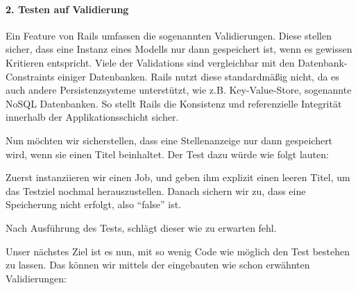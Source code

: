 \paragraph{2. Testen auf Validierung}

Ein Feature von Rails umfassen die sogenannten Validierungen. Diese stellen sicher, dass eine Instanz eines Modells nur dann gespeichert ist, wenn es gewissen Kritieren entspricht. Viele der Validations sind vergleichbar mit den Datenbank-Constraints einiger Datenbanken. Rails nutzt diese standardmäßig nicht, da es auch andere Persistenzsysteme unterstützt, wie z.B. Key-Value-Store, sogenannte NoSQL Datenbanken. So stellt Rails die Konsistenz und referenzielle Integrität innerhalb der Applikationsschicht sicher.

Nun möchten wir sicherstellen, dass eine Stellenanzeige nur dann gespeichert wird, wenn sie einen Titel beinhaltet. Der Test dazu würde wie folgt lauten:

\begin{ruby}[label={test/units/job\_test.rb}]
 

   
    
      
      
     
\end{ruby}
\tddred
Zuerst instanziieren wir einen Job, und geben ihm explizit einen leeren Titel, um das Testziel nochmal herauszustellen. Danach sichern wir zu, dass eine Speicherung nicht erfolgt, also "`false"' ist.

Nach Ausführung des Tests, schlägt dieser wie zu erwarten fehl.

Unser nächstes Ziel ist es nun, mit so wenig Code wie möglich den Test bestehen zu lassen. Das können wir mittels der eingebauten wie schon erwähnten Validierungen:

\begin{ruby}[label=app/models/job.rb]
   
      
\end{ruby}

